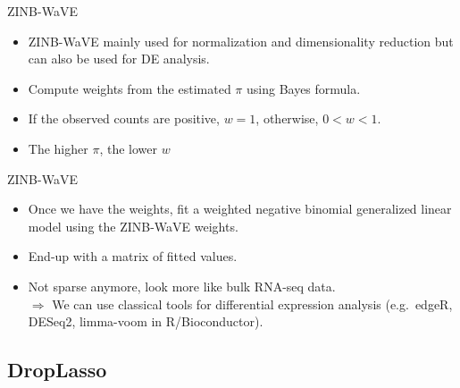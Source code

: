 \documentclass{beamer}
\begin{document}

\begin{frame}{ZINB-WaVE}
\begin{itemize}
  \itemsep10pt
  \item ZINB-WaVE mainly used for normalization and dimensionality reduction but
    can also be used for DE analysis.
  \item Compute weights from the estimated $\pi$ using Bayes formula.
  \item If the observed counts are positive, $w = 1$, otherwise, $0<w<1$.
  \item The higher $\pi$, the lower $w$
\end{itemize}
\end{frame}


\begin{frame}{ZINB-WaVE}

\begin{itemize}
  \itemsep10pt
  \item Once we have the weights, fit a weighted negative binomial generalized
    linear model using the ZINB-WaVE weights.
  \item End-up with a matrix of fitted values.
  \item Not sparse anymore, look more like bulk RNA-seq data.\\
    $\Longrightarrow$ We can use classical tools for differential expression
    analysis (e.g.~edgeR, DESeq2, limma-voom in R/Bioconductor).
\end{itemize}

\end{frame}

\subsection{DropLasso}
\end{document}

